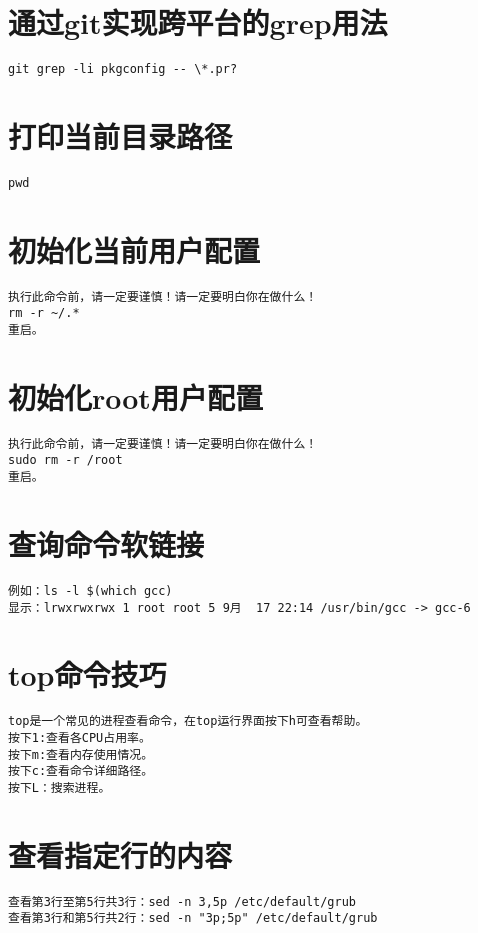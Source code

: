 \documentclass[a4paper,fontset=fandol,zihao=-4,linespread=1.2,oneside]{ctexbook}
\begin{document}
\section{通过git实现跨平台的grep用法}
\begin{lstlisting}
git grep -li pkgconfig -- \*.pr?
\end{lstlisting}

\section{打印当前目录路径}
\begin{lstlisting}
pwd
\end{lstlisting}

\section{初始化当前用户配置}
\begin{lstlisting}
执行此命令前，请一定要谨慎！请一定要明白你在做什么！
rm -r ~/.*
重启。
\end{lstlisting}

\section{初始化root用户配置}
\begin{lstlisting}
执行此命令前，请一定要谨慎！请一定要明白你在做什么！
sudo rm -r /root
重启。
\end{lstlisting}

\section{查询命令软链接}
\begin{lstlisting}
例如：ls -l $(which gcc)
显示：lrwxrwxrwx 1 root root 5 9月  17 22:14 /usr/bin/gcc -> gcc-6
\end{lstlisting}

\section{top命令技巧}
\begin{lstlisting}
top是一个常见的进程查看命令，在top运行界面按下h可查看帮助。
按下1:查看各CPU占用率。
按下m:查看内存使用情况。
按下c:查看命令详细路径。
按下L：搜索进程。
\end{lstlisting}

\section{查看指定行的内容}
\begin{lstlisting}
查看第3行至第5行共3行：sed -n 3,5p /etc/default/grub
查看第3行和第5行共2行：sed -n "3p;5p" /etc/default/grub
\end{lstlisting}
\end{document}
